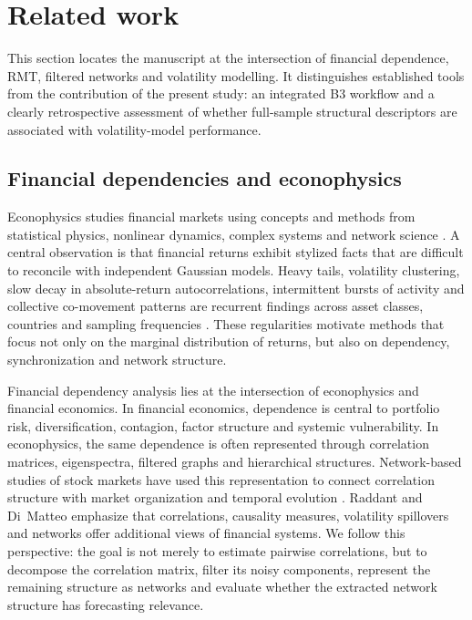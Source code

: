\section{Related work}
\label{sec:related_work}

This section locates the manuscript at the intersection of financial dependence, RMT, filtered networks and volatility modelling. It distinguishes established tools from the contribution of the present study: an integrated B3 workflow and a clearly retrospective assessment of whether full-sample structural descriptors are associated with volatility-model performance.

\subsection{Financial dependencies and econophysics}

Econophysics studies financial markets using concepts and methods from statistical physics, nonlinear dynamics, complex systems and network science \cite{smolyak_havlin_2022_econophysics,vogl_2022_financial_chaos}. A central observation is that financial returns exhibit stylized facts that are difficult to reconcile with independent Gaussian models. Heavy tails, volatility clustering, slow decay in absolute-return autocorrelations, intermittent bursts of activity and collective co-movement patterns are recurrent findings across asset classes, countries and sampling frequencies \cite{mantegna_stanley_1999_book,cont_2001_empirical}. These regularities motivate methods that focus not only on the marginal distribution of returns, but also on dependency, synchronization and network structure.

Financial dependency analysis lies at the intersection of econophysics and financial economics. In financial economics, dependence is central to portfolio risk, diversification, contagion, factor structure and systemic vulnerability. In econophysics, the same dependence is often represented through correlation matrices, eigenspectra, filtered graphs and hierarchical structures. Network-based studies of stock markets have used this representation to connect correlation structure with market organization and temporal evolution \cite{chi_2010_network,kumar_2012_correlation}. Raddant and Di~Matteo \cite{raddant_dimatteo_2023} emphasize that correlations, causality measures, volatility spillovers and networks offer additional views of financial systems. We follow this perspective: the goal is not merely to estimate pairwise correlations, but to decompose the correlation matrix, filter its noisy components, represent the remaining structure as networks and evaluate whether the extracted network structure has forecasting relevance.

